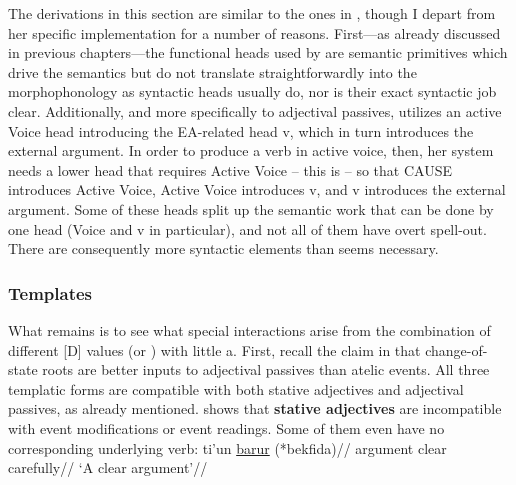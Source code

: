 The derivations in this section are similar to the ones in \cite{doron14adj}, though I depart from her specific implementation for a number of reasons. First---as already discussed in previous chapters---the functional heads used by \citeauthor{doron14adj} are semantic primitives which drive the semantics but do not translate straightforwardly into the morphophonology as syntactic heads usually do, nor is their exact syntactic job clear. Additionally, and more specifically to adjectival passives, \cite{doron14adj} utilizes an active Voice head introducing the EA-related head v, which in turn introduces the external argument. In order to produce a verb in active voice, then, her system needs a lower head that requires Active Voice -- this is  -- so that CAUSE introduces Active Voice, Active Voice introduces v, and v introduces the external argument. Some of these heads split up the semantic work that can be done by one head (Voice and v in particular), and not all of them have overt spell-out. There are consequently more syntactic elements than seems necessary. %




	    \subsubsection{Templates} \label{passn:adjpass:a:temp}
What remains is to see what special interactions arise from the combination of different [D] values (or {\va}) with little a. First, recall the claim in \cite{doron00} that change-of-state roots are better inputs to adjectival passives than atelic events. All three templatic forms are compatible with both stative adjectives and adjectival passives, as already mentioned. \citet[170]{doron14adj} shows that \textbf{stative adjectives} are incompatible with event modifications or event readings. Some of them even have no corresponding underlying verb:
\pex
	\a \begingl
		\gla ti'un \underline{barur} (*bekfida)//
		\glb argument clear \phantom{(*}carefully//
		\glft `A clear argument'//
	\endgl

